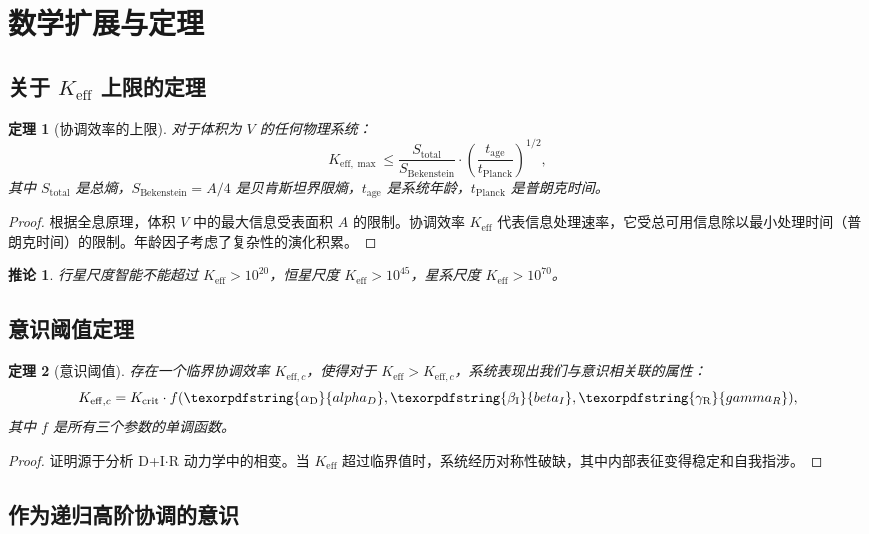 \documentclass[11pt,a4paper]{article}
\newtheorem{theorem}{定理}
\newtheorem{corollary}{推论}
\DeclareRobustCommand{\alD}{\texorpdfstring{\ensuremath{\alpha_{\mathrm{D}}}}{alpha_D}}
\DeclareRobustCommand{\beI}{\texorpdfstring{\ensuremath{\beta_{\mathrm{I}}}}{beta_I}}
\DeclareRobustCommand{\gaR}{\texorpdfstring{\ensuremath{\gamma_{\mathrm{R}}}}{gamma_R}}
\newcommand{\eff}{\mathrm{eff}}
\newcommand{\Ke}{K_{\eff}}
\newcommand{\Kemax}{K_{\eff,\max}}
\newcommand{\Kec}{K_{\eff,c}}
\newcommand{\Kcrit}{K_{\mathrm{crit}}}
\begin{document}
	\section{数学扩展与定理}
	
	\subsection{关于 \(\Ke\) 上限的定理}
	
	\begin{theorem}[协调效率的上限]
		对于体积为 \(V\) 的任何物理系统：
		\[
		\Kemax \leq \frac{S_{\mathrm{total}}}{S_{\mathrm{Bekenstein}}} \cdot \left(\frac{t_{\mathrm{age}}}{t_{\mathrm{Planck}}}\right)^{1/2},
		\]
		其中 \(S_{\mathrm{total}}\) 是总熵，\(S_{\mathrm{Bekenstein}} = A/4\) 是贝肯斯坦界限熵，\(t_{\mathrm{age}}\) 是系统年龄，\(t_{\mathrm{Planck}}\) 是普朗克时间。
	\end{theorem}
	
	\begin{proof}
		根据全息原理，体积 \(V\) 中的最大信息受表面积 \(A\) 的限制。协调效率 \(\Ke\) 代表信息处理速率，它受总可用信息除以最小处理时间（普朗克时间）的限制。年龄因子考虑了复杂性的演化积累。
	\end{proof}
	
	\begin{corollary}
		行星尺度智能不能超过 \(\Ke > 10^{20}\)，恒星尺度 \(\Ke > 10^{45}\)，星系尺度 \(\Ke > 10^{70}\)。
	\end{corollary}
	
	\subsection{意识阈值定理}
	
	\begin{theorem}[意识阈值]
		存在一个临界协调效率 \(K_{\eff,c}\)，使得对于 \(\Ke > K_{\eff,c}\)，系统表现出我们与意识相关联的属性：
		\[
		\Kec = \Kcrit \cdot f(\alD, \beI, \gaR),
		\]
		其中 \(f\) 是所有三个参数的单调函数。
	\end{theorem}
	
	\begin{proof}
		证明源于分析 D+I\(\cdot\)R 动力学中的相变。当 \(\Ke\) 超过临界值时，系统经历对称性破缺，其中内部表征变得稳定和自我指涉。
	\end{proof}
	
	\subsection{作为递归高阶协调的意识}
	\label{subsec:recursive-coordination}
	
\end{document}
